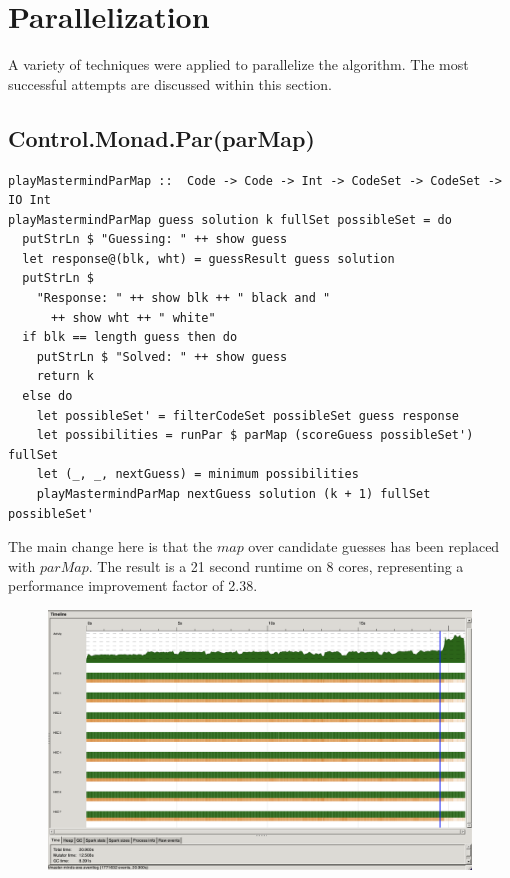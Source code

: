 \documentclass{article}
\begin{document}
\section{Parallelization}
A variety of techniques were applied to parallelize the algorithm. The most successful attempts are discussed within this section.
\subsection{Control.Monad.Par(parMap)}
\begin{verbatim}
playMastermindParMap ::  Code -> Code -> Int -> CodeSet -> CodeSet -> IO Int
playMastermindParMap guess solution k fullSet possibleSet = do
  putStrLn $ "Guessing: " ++ show guess
  let response@(blk, wht) = guessResult guess solution
  putStrLn $
    "Response: " ++ show blk ++ " black and "
      ++ show wht ++ " white"
  if blk == length guess then do
    putStrLn $ "Solved: " ++ show guess
    return k
  else do
    let possibleSet' = filterCodeSet possibleSet guess response
    let possibilities = runPar $ parMap (scoreGuess possibleSet') fullSet
    let (_, _, nextGuess) = minimum possibilities
    playMastermindParMap nextGuess solution (k + 1) fullSet possibleSet'
\end{verbatim}
The main change here is that the $map$ over candidate guesses has been replaced with $parMap$. The result is a 21 second runtime on 8 cores, representing a performance improvement factor of 2.38.
\begin{figure}[H]
	\centering
	\includegraphics[width=35em]{../images/first_pm.png}
\end{figure}
\end{document}
